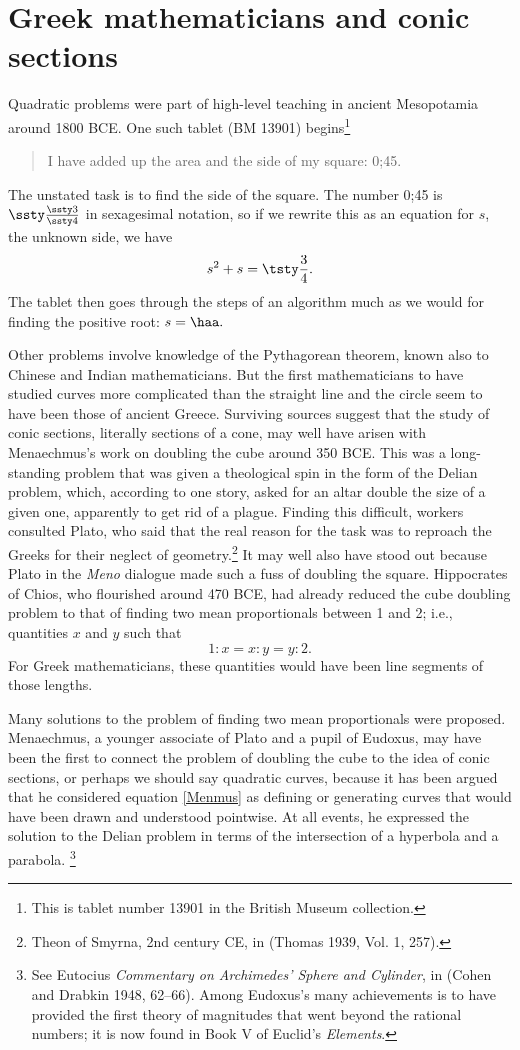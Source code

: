 \section{Greek mathematicians and conic sections}
Quadratic problems were part of high-level teaching in ancient Mesopotamia around 1800 BCE. One such tablet (BM 13901) begins\footnote{This is tablet number 13901 in the British Museum collection.} 
\begin{quote}
I have added up the area and the side of my square: 0;45.
\end{quote}
The unstated task is to find the side of the square.
The number 0;45 is $\ssty\frac{\ssty3}{\ssty4}$ in sexagesimal notation, 
so if we rewrite this as an equation for $s$, the unknown side, we have
$$s^2 + s = \tsty\frac{3}{4}.$$
The tablet then goes through the steps of an algorithm much as we would 
for finding the positive root: $s = \haa.$ 

Other problems involve knowledge of the Pythagorean theorem, known also to Chinese and Indian mathematicians. But the first mathematicians to have studied curves more complicated than the straight line and the circle seem to have been those of ancient Greece.  Surviving sources suggest that the study of conic sections, literally sections of a cone, may well have arisen with Menaechmus's work on doubling the cube around 350 BCE. This was a long-standing problem that was given a theological spin in the form of the Delian problem, which, according to one story, asked for an altar double the size of a given one, apparently to get rid of a plague. Finding this difficult, workers consulted Plato, who said that the real reason for the task was to reproach the Greeks for their neglect of geometry.\footnote{Theon of Smyrna, 2nd century CE, in (Thomas 1939, Vol. 1, 257).}
It may well also have stood out because Plato in the \emph{Meno}
dialogue made such a fuss of doubling the square. Hippocrates of
Chios, who flourished around 470 BCE,  had already reduced the 
cube doubling
problem to that of finding two mean proportionals between 1 and 2; 
i.e., quantities $x$ and $y$ such that 
\begin{equation}\label{Menmus}
1:x= x:y = y: 2.
\tag{$*$}
\end{equation}
For Greek mathematicians, these quantities would have been line segments of those lengths. 

Many solutions to the problem of finding two mean proportionals were
proposed.
Menaechmus, a younger associate of Plato and a pupil of Eudoxus, may
have been the first to connect the problem of doubling the cube to the
idea of conic sections, or perhaps we should say quadratic curves,
because it has been argued that he considered equation \eqref{Menmus}
as defining or generating curves that would have been drawn and
understood pointwise. At all events, he expressed the solution to the
Delian problem in terms of the intersection of a hyperbola and a
parabola.%
\footnote{See Eutocius \emph{Commentary on Archimedes' Sphere
  and Cylinder}, in (Cohen and Drabkin 1948, 62--66). 
  Among Eudoxus's many achievements is to have provided the first theory of
  magnitudes that went beyond the rational numbers; it is now found in
  Book V of Euclid's \emph{Elements}.}

